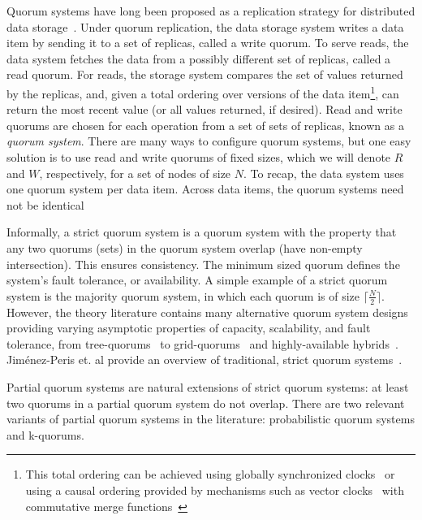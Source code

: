 \documentclass{vldb}
\begin{document}
Quorum systems have long been proposed as a replication strategy for
distributed data storage~\cite{quorums-start}.  Under quorum
replication, the data storage system writes a data item by sending it
to a set of replicas, called a write quorum.  To serve reads, the data
system fetches the data from a possibly different set of replicas,
called a read quorum.  For reads, the storage system compares the set
of values returned by the replicas, and, given a total ordering over
versions of the data item\footnote{This total ordering can be achieved
  using globally synchronized clocks~\cite{synch-clocks} or using a
  causal ordering provided by mechanisms such as vector
  clocks~\cite{vectorclock} with commutative merge
  functions~\cite{cops}}, can return the most recent value (or all
values returned, if desired).  Read and write quorums are chosen for
each operation from a set of sets of replicas, known as a
\textit{quorum system}.  There are many ways to configure quorum
systems, but one easy solution is to use read and write quorums of
fixed sizes, which we will denote $R$ and $W$, respectively, for a set
of nodes of size $N$.  To recap, the data system uses one quorum
system per data item.  Across data items, the quorum systems need not
be identical

Informally, a strict quorum system is a quorum system with the
property that any two quorums (sets) in the quorum system overlap
(have non-empty intersection). This ensures consistency.  The minimum
sized quorum defines the system's fault tolerance, or availability.  A
simple example of a strict quorum system is the majority quorum
system, in which each quorum is of size $\lceil \frac{N}{2}\rceil$.
However, the theory literature contains many alternative quorum
system designs providing varying asymptotic properties of capacity,
scalability, and fault tolerance, from tree-quorums~\cite{treequorum}
to grid-quorums~\cite{quorumsystems} and highly-available hybrids~\cite{92-quorums}.  Jim\'{e}nez-Peris et. al
provide an overview of traditional, strict quorum
systems~\cite{quorums-alternative}.

Partial quorum systems are natural extensions of strict quorum
systems: at least two quorums in a partial quorum system do not
overlap.  There are two relevant variants of partial quorum systems in
the literature: probabilistic quorum systems and k-quorums.
\end{document}

